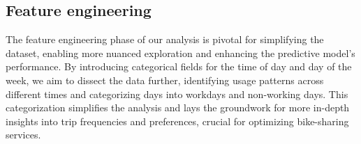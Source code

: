 \documentclass[12pt, a4paper]{article}
\begin{document}
    \subsection{Feature engineering}\label{subsec:feature-engineering}
    The feature engineering phase of our analysis is pivotal for simplifying the dataset, enabling more nuanced exploration and enhancing the predictive model's performance.
    By introducing categorical fields for the time of day and day of the week, we aim to dissect the data further, identifying usage patterns across different times and categorizing days into workdays and non-working days.
    This categorization simplifies the analysis and lays the groundwork for more in-depth insights into trip frequencies and preferences, crucial for optimizing bike-sharing services.
%
\end{document}
